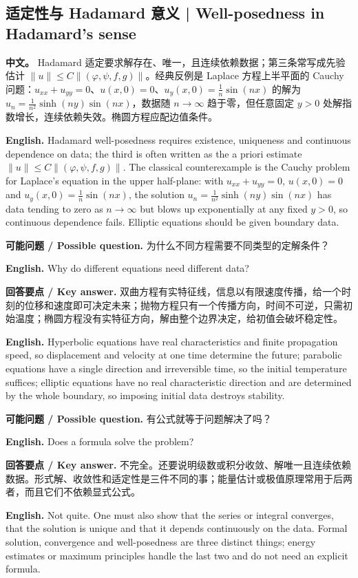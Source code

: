 \documentclass[UTF8,11pt,a4paper]{ctexart}
\newcommand{\EN}[1]{\par\noindent \textbf{English.} #1\par}
\newcommand{\ASK}[4]{\par\noindent \textbf{可能问题 / Possible question.} #1\par\EN{#2}\noindent \textbf{回答要点 / Key answer.} #3\par\EN{#4}\medskip}
\newcommand{\APS}[2]{\par\noindent\textbf{中文。} #1\par\noindent\textbf{English.} #2\par\smallskip}
\begin{document}
\subsection{适定性与 Hadamard 意义 | Well-posedness in Hadamard's sense}
\APS{Hadamard 适定要求解存在、唯一，且连续依赖数据；第三条常写成先验估计 $\|u\|\le C\|(\varphi,\psi,f,g)\|$。经典反例是 Laplace 方程上半平面的 Cauchy 问题：$u_{xx}+u_{yy}=0$、$u(x,0)=0$、$u_y(x,0)=\frac1n\sin(nx)$ 的解为 $u_n=\frac1{n^2}\sinh(ny)\sin(nx)$，数据随 $n\to\infty$ 趋于零，但任意固定 $y>0$ 处解指数增长，连续依赖失效。椭圆方程应配边值条件。}{Hadamard well-posedness requires existence, uniqueness and continuous dependence on data; the third is often written as the a priori estimate $\|u\|\le C\|(\varphi,\psi,f,g)\|$. The classical counterexample is the Cauchy problem for Laplace's equation in the upper half-plane: with $u_{xx}+u_{yy}=0$, $u(x,0)=0$ and $u_y(x,0)=\frac1n\sin(nx)$, the solution $u_n=\frac1{n^2}\sinh(ny)\sin(nx)$ has data tending to zero as $n\to\infty$ but blows up exponentially at any fixed $y>0$, so continuous dependence fails. Elliptic equations should be given boundary data.}
\ASK{为什么不同方程需要不同类型的定解条件？}{Why do different equations need different data?}{双曲方程有实特征线，信息以有限速度传播，给一个时刻的位移和速度即可决定未来；抛物方程只有一个传播方向，时间不可逆，只需初始温度；椭圆方程没有实特征方向，解由整个边界决定，给初值会破坏稳定性。}{Hyperbolic equations have real characteristics and finite propagation speed, so displacement and velocity at one time determine the future; parabolic equations have a single direction and irreversible time, so the initial temperature suffices; elliptic equations have no real characteristic direction and are determined by the whole boundary, so imposing initial data destroys stability.}
\ASK{有公式就等于问题解决了吗？}{Does a formula solve the problem?}{不完全。还要说明级数或积分收敛、解唯一且连续依赖数据。形式解、收敛性和适定性是三件不同的事；能量估计或极值原理常用于后两者，而且它们不依赖显式公式。}{Not quite. One must also show that the series or integral converges, that the solution is unique and that it depends continuously on the data. Formal solution, convergence and well-posedness are three distinct things; energy estimates or maximum principles handle the last two and do not need an explicit formula.}
\end{document}
